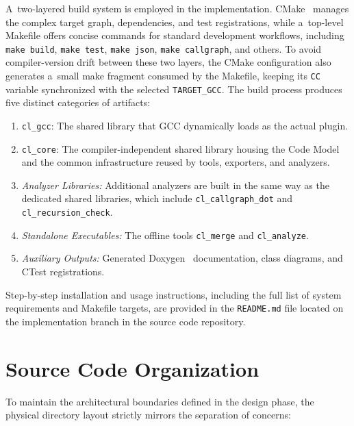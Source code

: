 \documentclass[xpsejal00-gcc-plugin.tex]{subfiles}
\begin{document}
A~two-layered build system is employed in the implementation.
CMake~\cite{CMake} manages the complex target graph, dependencies, and test registrations, while a~top-level Makefile offers concise commands for standard development workflows, including \texttt{make build}, \texttt{make test}, \texttt{make json}, \texttt{make callgraph}, and others.
To avoid compiler-version drift between these two layers, the CMake configuration also generates a~small make fragment consumed by the Makefile, keeping its \texttt{CC} variable synchronized with the selected \texttt{TARGET\_GCC}.
The build process produces five distinct categories of artifacts:

\begin{enumerate}
  \item \texttt{cl\_gcc}: The shared library that GCC dynamically loads as the actual plugin.
  \item \texttt{cl\_core}: The compiler-independent shared library housing the Code Model and the common infrastructure reused by tools, exporters, and analyzers.
  \item \textit{Analyzer Libraries:} Additional analyzers are built in the same way as the dedicated shared libraries, which include \texttt{cl\_callgraph\_dot} and \texttt{cl\_recursion\_check}.
  \item \textit{Standalone Executables:} The offline tools \texttt{cl\_merge} and \texttt{cl\_analyze}.
  \item \textit{Auxiliary Outputs:} Generated Doxygen~\cite{Doxygen} documentation, class diagrams, and CTest registrations.
\end{enumerate}

Step-by-step installation and usage instructions, including the full list of system requirements and Makefile targets, are provided in the \texttt{README.md} file located on the implementation branch in the source code repository.

\section{Source Code Organization}\label{sec:source-organization}

To maintain the architectural boundaries defined in the design phase, the physical directory layout strictly mirrors the separation of concerns:
\end{document}
